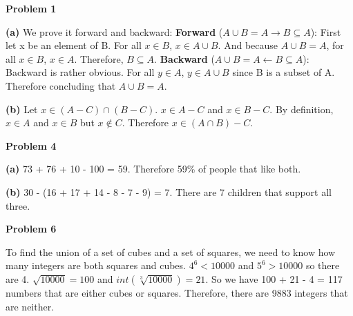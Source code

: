 \documentclass[12pt,letterpaper]{hmcpset}
\begin{document}
\begin{problem}
	\textbf{Problem 1}
\end{problem}

\begin{solution}
	\textbf{(a)} We prove it forward and backward:
	\newline \textbf{Forward} ($A\cup B = A \rightarrow B\subseteq A$):
	\newline First let x be an element of B. For all $x\in B$, $x\in A\cup B$. And because $A\cup B = A$, for all $x\in B$, $x\in A$. Therefore, $B \subseteq A$.
	\newline
	\newline \textbf{Backward} ($A\cup B = A \leftarrow B\subseteq A$):
	\newline Backward is rather obvious. For all $y \in A$, $y\in A\cup B$ since B is a subset of A. Therefore concluding that $A\cup B = A$.
\end{solution}

\begin{solution}
	\textbf{(b)} Let $x\in (A-C)\cap (B-C)$. $x\in A - C$ and $x\in B - C$. By definition, $x\in A$ and $x\in B$ but $x\notin C$. Therefore $x\in (A\cap B) - C$.
\end{solution}

\begin{problem}
	\textbf{Problem 4}
\end{problem}

\begin{solution}
	\textbf{(a)} 73 + 76 + 10 - 100 = 59. Therefore 59\% of people that like both.
\end{solution}

\begin{solution}
	\textbf{(b)} 30 - (16 + 17 + 14 - 8 - 7 - 9) = 7. There are 7 children that support all three.
\end{solution}

\begin{problem}
	\textbf{Problem 6} 
\end{problem}

\begin{solution}
	To find the union of a set of cubes and a set of squares, we need to know how many integers are both squares and cubes. $4^6<10000$ and $5^6>10000$ so there are 4. $\sqrt{10000} = 100$ and $int(\sqrt[3]{10000}) = 21$. So we have 100 + 21 - 4 = 117 numbers that are either cubes or squares. Therefore, there are 9883 integers that are neither.
\end{solution}
\end{document}
